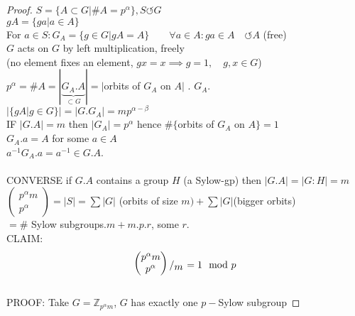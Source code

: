 \documentclass{article}
\newcommand{\Z}{\mathbb{Z}}
\newcommand{\quotient}[2]{{\raisebox{.2em}{$#1$}\left/\raisebox{-.2em}{$#2$}\right.}}
\newcommand{\abs}[1]{\left|#1\right|}
\theoremstyle{definition}
\theoremstyle{remark}
\theoremstyle{example}
\begin{document}
		\begin{proof}
			$S=\{A \subset G | \#A=p^\alpha \}, S \circlearrowleft G$\\
			$gA=\{ga|a\in A \}$\\
			For $a \in S: G_A=\{g \in G |gA=A \}\qquad \forall a \in A:ga \in A \quad \circlearrowleft A$ (free)\\
			$G$ acts on $G$ by left multiplication, freely\\(no element fixes an element, $gx=x \implies g =1, \quad g,x \in G $)\\
			$p^\alpha=\#A=\abs{\underbrace{G_A.A}_{\subset G}}=|$orbits of $G_A$ on $A|$ . $G_A$.\\
			$\abs{\{gA|g\in G \}}=\abs{G.G_A}=mp^{\alpha-\beta}$\\
			IF $\abs{G.A}=m$ then $\abs{G_A}=p^\alpha$ hence $\#\{$orbits of $G_A$ on $A\}=1$\\
			$G_A.a=A$ for some $a \in A$\\
			$a^{-1}G_A.a=a^{-1} \in G.A$.\\\\
			CONVERSE if $G.A$ contains a group $H$ (a Sylow-gp) then $\abs{G.A}=\abs{G:H}=m$\\
			$\begin{pmatrix}
				p^\alpha m\\
				p^\alpha
			\end{pmatrix}=\abs{S}=\sum|G|$ (orbits of size $m) +\sum \abs{G} $(bigger orbits)\\
			$=\#$ Sylow subgroups$.m+m.p.r$, some $r$.\\
			CLAIM: \[\quotient{\begin{pmatrix}
				p^\alpha m\\
				p^\alpha
			\end{pmatrix}}{m}=1 \mod p\]\\
			PROOF: Take $G= \Z_{p^\alpha m}$, $G$ has exactly one $p-$Sylow subgroup
		\end{proof}
	\pagebreak
\end{document}
